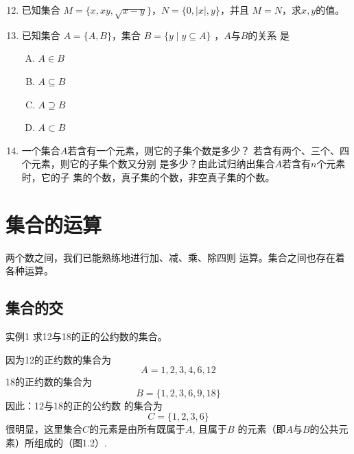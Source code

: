 \begin{enumerate}
    \setcounter{enumi}{11}
    \item 已知集合
    $M=\{x,    xy,\sqrt{x-y}\}$，$N=\{0,|x|,y\}$，并且
    $M=N$，求$x,y$的值。
    \item 已知集合
    $A=\{A,B\}$，集合
    $B=\{y\mid y\subseteq A\}$
    ，$A$与$B$的关系
    是
\begin{multicols}{4}
    \begin{enumerate}[(A)]
        \item $A\in B$
        \item $A\subseteq B$
        \item $A\supseteq B$
        \item $A\subset B$
    \end{enumerate}
\end{multicols}

    \item 一个集合$A$若含有一个元素，则它的子集个数是多少？
    若含有两个、三个、四个元素，则它的子集个数又分别
    是多少？由此试归纳出集合$A$若含有$n$个元素时，它的子
    集的个数，真子集的个数，非空真子集的个数。
\end{enumerate}

\section{集合的运算}
两个数之间，我们已能熟练地进行加、减、乘、除四则
运算。集合之间也存在着各种运算。
\subsection{集合的交}

\begin{thm}{实例1}
    求12与18的正的公约数的集合。
\end{thm}

因为12的正约数的集合为
\[A={1,2,3,4,6,12}\]
18的正约数的集合为
\[B=\{1,2,3,6,9,18\}\]
因此：12与18的正的公约数
的集合为
\[C=\{1,2,3,6\}\]
很明显，这里集合$C$的元素是由所有既属于$A$, 且属于$B$
的元素（即$A$与$B$的公共元素）所组成的（图1.2）.

\begin{figure}[htp]
    \centering
{}
    \caption{}
\end{figure}




